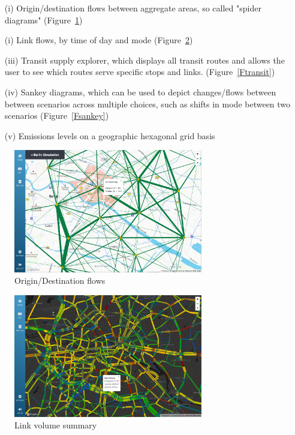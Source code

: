 \documentclass[Afour,sagev,times]{sagej}
\begin{document}
\begin{enumerate}

\item[(i)] Origin/destination flows between aggregate areas, so called "spider diagrams" (Figure~\ref{Fod})
\item[(i)] Link flows, by time of day and mode (Figure~\ref{Flinkvols})
\item[(iii)] Transit supply explorer, which displays all transit routes and allows the user to see which routes serve specific stops and links. (Figure~\ref{Ftransit})
\item[(iv)] Sankey diagrams, which can be used to depict changes/flows between between scenarios across multiple choices, such as shifts in mode between two scenarios (Figure~\ref{Fsankey})
\item[(v)] Emissions levels on a geographic hexagonal grid basis

\end{enumerate}

\begin{figure}
\centering
\includegraphics[width=3.25in]{fig-odflow.png}
\caption{Origin/Destination flows}\label{Fod}
\end{figure}

\begin{figure}
\centering
\includegraphics[width=3.25in]{fig-linkvols.png}
\caption{Link volume summary}\label{Flinkvols}
\end{figure}
\end{document}
